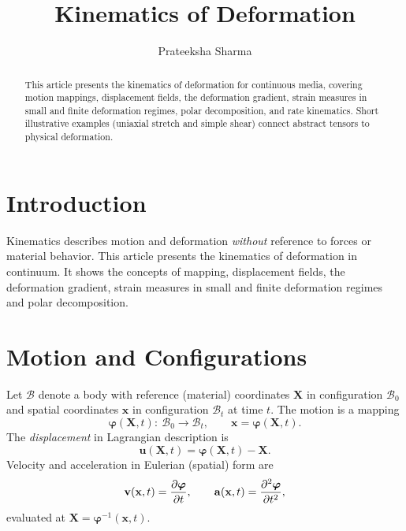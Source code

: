 \documentclass[12pt,a4paper]{article}
\title{\textbf{Kinematics of Deformation}}
\author{Prateeksha Sharma}
\date{}
\begin{document}
\maketitle

\begin{abstract}
This article presents the kinematics of deformation for continuous media, covering motion mappings, displacement fields, the deformation gradient, strain measures in small and finite deformation regimes, polar decomposition, and rate kinematics. Short illustrative examples (uniaxial stretch and simple shear) connect abstract tensors to physical deformation.
\end{abstract}

\section{Introduction}
Kinematics describes motion and deformation \emph{without} reference to forces or material behavior. This article presents the kinematics of deformation in continuum. It shows the concepts of mapping, displacement fields, the deformation gradient, strain measures in small and finite deformation regimes and polar decomposition.


\section{Motion and Configurations}
Let $\mathcal{B}$ denote a body with reference (material) coordinates $\mathbf{X}$ in configuration $\mathcal{B}_0$ and spatial coordinates $\mathbf{x}$ in configuration $\mathcal{B}_t$ at time $t$. The motion is a mapping
\begin{equation}
\boldsymbol{\varphi}(\mathbf{X},t): \ \mathcal{B}_0 \to \mathcal{B}_t,\qquad \mathbf{x} = \boldsymbol{\varphi}(\mathbf{X},t).
\end{equation}
The \emph{displacement} in Lagrangian description is
\begin{equation}
\mathbf{u}(\mathbf{X},t) = \boldsymbol{\varphi}(\mathbf{X},t) - \mathbf{X}.
\end{equation}
Velocity and acceleration in Eulerian (spatial) form are
\begin{equation}
\mathbf{v}(\mathbf{x},t) = \pdv{\boldsymbol{\varphi}}{t}(\mathbf{X},t),\qquad \mathbf{a}(\mathbf{x},t) = \pdv[2]{\boldsymbol{\varphi}}{t}(\mathbf{X},t),
\end{equation}
evaluated at $\mathbf{X}=\boldsymbol{\varphi}^{-1}(\mathbf{x},t)$.
\end{document}
